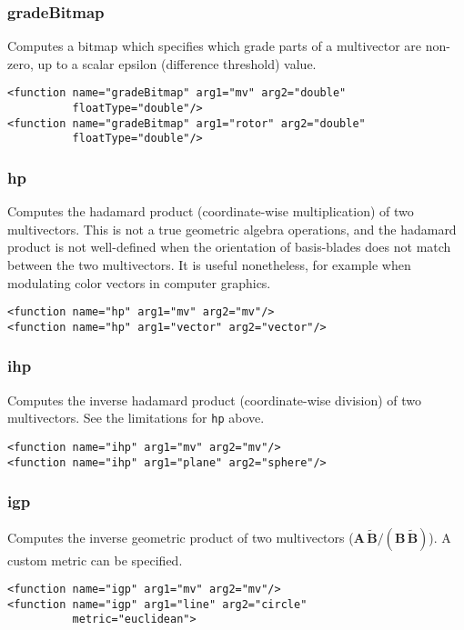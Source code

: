 \documentclass[10pt, a4paper]{article}
\newcommand{\gav}[1]{\ensuremath{\mathbf{#1}}}
\newcommand{\gp}{\,}
\newcommand{\rev}[1]{\widetilde{#1}}
\begin{document}
\subsubsection*{gradeBitmap}

Computes a bitmap which specifies which grade parts of a multivector are non-zero, up to a scalar epsilon (difference threshold) value.
\begin{verbatim}
<function name="gradeBitmap" arg1="mv" arg2="double" 
          floatType="double"/>
<function name="gradeBitmap" arg1="rotor" arg2="double"
          floatType="double"/>
\end{verbatim}

\subsubsection*{hp}

Computes the hadamard product (coordinate-wise multiplication) of two multivectors. This
is not a true geometric algebra operations, and the hadamard product is not well-defined
when the orientation of basis-blades does not match between the two multivectors. It is useful
nonetheless, for example when modulating color vectors in computer graphics.
\begin{verbatim}
<function name="hp" arg1="mv" arg2="mv"/>
<function name="hp" arg1="vector" arg2="vector"/>
\end{verbatim}

\subsubsection*{ihp}

Computes the inverse hadamard product (coordinate-wise division) of two multivectors. 
See the limitations for {\tt hp} above.
\begin{verbatim}
<function name="ihp" arg1="mv" arg2="mv"/>
<function name="ihp" arg1="plane" arg2="sphere"/>
\end{verbatim}


\subsubsection*{igp}

Computes the inverse geometric product of two multivectors ($\gav{A} \gp \rev{\gav{B}} / (\gav{B} \gp \rev{\gav{B}})$).
A custom metric can be specified.
\begin{verbatim}
<function name="igp" arg1="mv" arg2="mv"/>
<function name="igp" arg1="line" arg2="circle" 
          metric="euclidean">
\end{verbatim}
\end{document}
